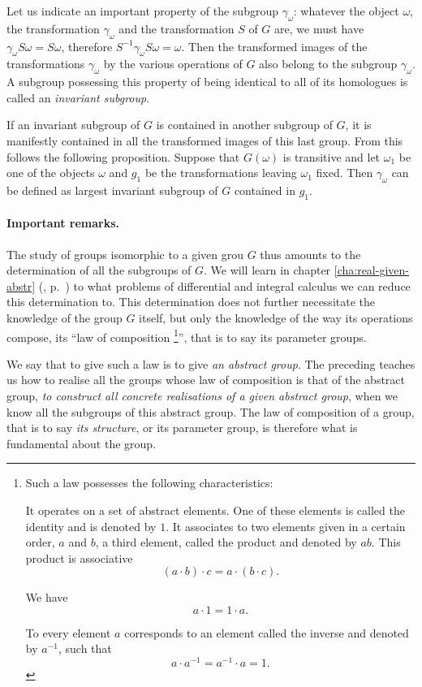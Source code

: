 \somespace

Let us indicate an important property of the subgroup $\gamma_{\omega}$: whatever the object $\omega$, the transformation $\gamma_{\omega}$ and the transformation $S$ of $G$ are, we must have $\gamma_{\omega}S\omega=S\omega$, therefore $S^{-1}\gamma_{\omega}S\omega=\omega$. Then the transformed images of the transformations $\gamma_{\omega}$ by the various operations of $G$ also belong to the subgroup $\gamma_{\omega}$. A subgroup possessing this property of being identical to all of its homologues is called an \emph{invariant subgroup}.

If an invariant subgroup of $G$ is contained in another subgroup of $G$, it is manifestly contained in all the transformed images of this last group. From this follows the following proposition. Suppose that $G(\omega)$ is transitive and let $\omega_{1}$ be one of the objects $\omega$ and $g_{1}$ be the transformations leaving $\omega_{1}$ fixed. Then $\gamma_{\omega}$ can be defined as largest invariant subgroup of $G$ contained in $g_{1}$.

\paragraph{Important remarks.}
\label{sec:98}
The study of groups isomorphic to a given grou $G$ thus amounts to the determination of all the subgroups of $G$. We will learn in chapter \ref{cha:real-given-abstr} (, p.~\pageref{sec:115}) to what problems of differential and integral calculus we can reduce this determination to. This determination does not further necessitate the knowledge of the group $G$ itself, but only the knowledge of the way its operations compose, its ``law of composition \footnote{Such a law possesses the following characteristics:

It operates on a set of abstract elements. One of these elements is called the identity and is denoted by $1$. It associates to two elements given in a certain order, $a$ and $b$, a third element, called the product and denoted by $ab$. This product is associative
\[
(a\cdot b)\cdot c=a\cdot(b\cdot c).
\]

We have
\[
a\cdot 1=1\cdot a.
\]

To every element $a$ corresponds to an element called the inverse and denoted by $a^{-1}$, such that
\[
a\cdot a^{-1}=a^{-1}\cdot a=1.
\]
}'', that is to say its parameter groups.

We say that to give such a law is to give \emph{an abstract group}. The preceding teaches us how to realise all the groups whose law of composition is that of the abstract group, \emph{to construct all concrete realisations of a given abstract group}, when we know all the subgroups of this abstract group. The law of composition of a group, that is to say \emph{its structure}, or its parameter group, is therefore what is fundamental about the group.

